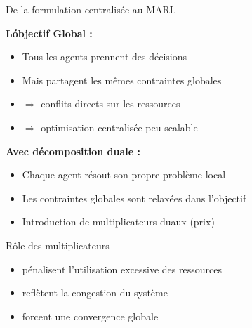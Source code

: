 \documentclass{beamer}
\begin{document}
\begin{frame}{De la formulation centralisée au MARL}

\small
\textbf{L\'objectif Global :}
\begin{itemize}
  \item Tous les agents prennent des décisions
  \item Mais partagent les mêmes contraintes globales
  \item $\Rightarrow$ conflits directs sur les ressources
  \item $\Rightarrow$ optimisation centralisée peu scalable
\end{itemize}

\medskip
\textbf{Avec décomposition duale :}
\begin{itemize}
  \item Chaque agent résout son propre problème local
  \item Les contraintes globales sont relaxées dans l’objectif
  \item Introduction de multiplicateurs duaux (prix)
\end{itemize}

\medskip
\begin{block}{Rôle des multiplicateurs}
\begin{itemize}
  \item pénalisent l’utilisation excessive des ressources
  \item reflètent la congestion du système
  \item forcent une convergence globale
\end{itemize}
\end{block}

\end{frame}
\end{document}
